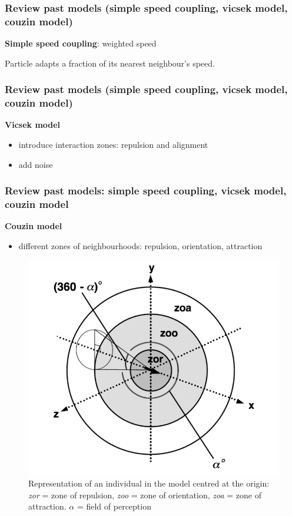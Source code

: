 \documentclass[compress]{beamer}
\begin{document}
\begin{frame}
	\frametitle{Review past models (simple speed coupling, vicsek model, couzin model)}
	
\textbf{Simple speed coupling}: weighted speed

\hspace{3}

Particle adapts a fraction of its nearest neighbour's speed.

\end{frame}


\begin{frame}
	\frametitle{Review past models (simple speed coupling, vicsek model, couzin model)}
	
	\textbf{Vicsek model} \\
	
	
	\begin{itemize}
		\item introduce interaction zones: repulsion and alignment
		\item add noise
	\end{itemize}
	
\end{frame}


\begin{frame}
	\frametitle{Review past models: simple speed coupling, vicsek model, couzin model}
	
	\textbf{Couzin model}
	
	\begin{itemize}
		\item different zones of neighbourhoods: repulsion, orientation, attraction
	\end{itemize}
	
\begin{figure}
	\includegraphics[width=.45\columnwidth, left]{./img/zones.png}
	\caption{Representation of an individual in the model centred at the origin: \textit{zor} = zone of repulsion, \textit{zoo} = zone of orientation, \textit{zoa} = zone of attraction. \( \alpha \) = field of perception}
	\label{zones}
\end{figure}

	
\end{frame}
\end{document}
